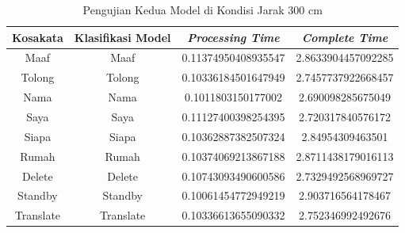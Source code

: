 \begin{longtable}{|c|c|c|c|}
  \caption{Pengujian Kedua Model di Kondisi Jarak 300 cm}
  \label{tb:prediksijauh2}                                   \\
  \hline
  \rowcolor[HTML]{C0C0C0}
  \textbf{Kosakata} & \textbf{Klasifikasi Model} & \textbf{\emph{Processing Time}} & \textbf{\emph{Complete Time}}\\
  \hline
  Maaf              & Maaf                        & 0.11374950408935547                           & 2.8633904457092285                                  \\
  Tolong            & Tolong                        & 0.10336184501647949                           & 2.7457737922668457                                  \\
  Nama              & Nama                        & 0.1011803150177002                           & 2.690098285675049                                  \\
  Saya              & Saya                        & 0.11127400398254395                           & 2.720317840576172                                  \\
  Siapa              & Siapa                        & 0.10362887382507324                           & 2.84954309463501                                  \\
  Rumah             & Rumah                        & 0.10374069213867188                           & 2.8711438179016113                                  \\
  Delete            & Delete                        & 0.10743093490600586                           & 2.7329492568969727                                  \\
  Standby           & Standby                        & 0.10061454772949219                           & 2.903716564178467                                  \\
  Translate         & Translate                        & 0.10336613655090332                           & 2.752346992492676                                  \\
  \hline
\end{longtable}

